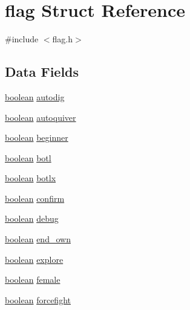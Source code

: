 \hypertarget{structflag}{\section{flag Struct Reference}
\label{structflag}
}


{\ttfamily \#include $<$flag.\+h$>$}

\subsection*{Data Fields}
\begin{DoxyCompactItemize}
\item 
\hyperlink{global_8h_a531b10dd351aa162d7dcccd1966308b8}{boolean} \hyperlink{structflag_a25cd860cd5077869e497f6c2b45fdd7c}{autodig}
\item 
\hyperlink{global_8h_a531b10dd351aa162d7dcccd1966308b8}{boolean} \hyperlink{structflag_ad18c2414f9c7c20bd9f909939c1dde52}{autoquiver}
\item 
\hyperlink{global_8h_a531b10dd351aa162d7dcccd1966308b8}{boolean} \hyperlink{structflag_ac488811edaec9208018e9abb54679274}{beginner}
\item 
\hyperlink{global_8h_a531b10dd351aa162d7dcccd1966308b8}{boolean} \hyperlink{structflag_a51f16d01a910b52fdf0c05a44739f7d8}{botl}
\item 
\hyperlink{global_8h_a531b10dd351aa162d7dcccd1966308b8}{boolean} \hyperlink{structflag_a4f41387168e1a58d95db3f635eec780e}{botlx}
\item 
\hyperlink{global_8h_a531b10dd351aa162d7dcccd1966308b8}{boolean} \hyperlink{structflag_ab97835d9cec46b62b236f42bfe9ce9e0}{confirm}
\item 
\hyperlink{global_8h_a531b10dd351aa162d7dcccd1966308b8}{boolean} \hyperlink{structflag_ac2d732f796f18d283c1675e7fa3b7dd5}{debug}
\item 
\hyperlink{global_8h_a531b10dd351aa162d7dcccd1966308b8}{boolean} \hyperlink{structflag_a2fcee44ffb7da2cbd895e94fe4c44395}{end\+\_\+own}
\item 
\hyperlink{global_8h_a531b10dd351aa162d7dcccd1966308b8}{boolean} \hyperlink{structflag_a2158b7a81927608e938818f91aa8c1e7}{explore}
\item 
\hyperlink{global_8h_a531b10dd351aa162d7dcccd1966308b8}{boolean} \hyperlink{structflag_ae3f866c572c50c676ecadf8acccf0c50}{female}
\item 
\hyperlink{global_8h_a531b10dd351aa162d7dcccd1966308b8}{boolean} \hyperlink{structflag_a527b68a0e2b522d3233eff485aa5f3fc}{forcefight}
\item 

\end{DoxyCompactItemize}
